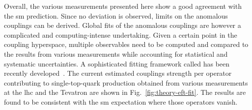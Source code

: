 
Overall, the various measurements presented here show a good agreement with the \gls{sm} prediction. Since no deviation is observed, limits on the anomalous couplings can be derived. Global fits of the anomalous couplings are however a complicated and computing-intense undertaking. Given a certain point in the coupling hyperspace, multiple observables need to be computed and compared to the results from various measurements while accounting for statistical and systematic uncertainties. A sophisticated fitting framework called \TOPFITTER[] has been recently developed~\cite{Buckley:2015lku}. The current estimated couplings strength per operator contributing to single-top-quark production obtained from various measurements at the \gls{lhc} and the Tevatron are shown in Fig.~\ref{fig:theory-eft-fit}. The results are found to be consistent with the \gls{sm} expectation where those operators vanish.


